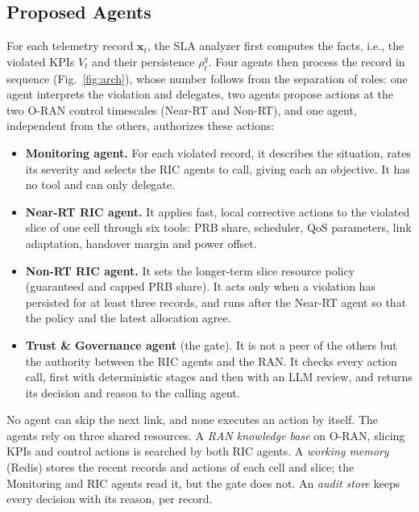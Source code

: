\documentclass[conference]{IEEEtran}
\begin{document}
\subsection{Proposed Agents}\label{sec:agents}

For each telemetry record $\mathbf{x}_t$, the SLA analyzer first computes the facts, i.e., the violated KPIs $V_t$ and their persistence $\rho_t^q$. Four agents then process the record in sequence (Fig.~\ref{fig:arch}), whose number follows from the
separation of roles: one agent interprets the violation and delegates, two agents propose actions at the two O-RAN control timescales (Near-RT and Non-RT), and one agent, independent from the others, authorizes these actions:

\begin{itemize}
\item \textbf{Monitoring agent.} For each violated record, it describes the situation, rates its severity and selects the RIC agents to call, giving each an objective. It has no tool and can only delegate.
\item \textbf{Near-RT RIC agent.} It applies fast, local corrective actions to the violated slice of one cell through six tools: PRB share, scheduler, QoS parameters, link adaptation, handover margin and power offset.
\item \textbf{Non-RT RIC agent.} It sets the longer-term slice resource policy (guaranteed and capped PRB share). It acts only when a violation has persisted for at least three records, and runs after the Near-RT agent so that the policy and the latest allocation agree.
\item \textbf{Trust \& Governance agent} (the gate). It is not a peer of the others but the authority between the RIC agents and the RAN. It checks every action call, first with deterministic stages and then with an LLM review, and returns its decision and reason to the calling agent.
\end{itemize}

No agent can skip the next link, and none executes an action by itself. The agents rely on three shared resources. A \emph{RAN knowledge base} on O-RAN, slicing KPIs and control actions is searched by both RIC agents. A \emph{working memory} (Redis) stores the recent records and actions of each cell
and slice; the Monitoring and RIC agents read it, but the gate does not. An \emph{audit store} keeps every decision with its reason, per record.
\end{document}

